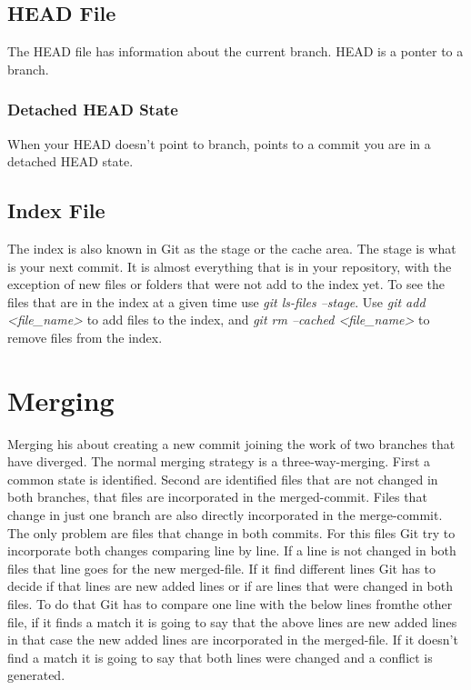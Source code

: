 \subsection{HEAD File}

The HEAD file has information about the current branch.
HEAD is a ponter to a branch.

\subsubsection{Detached HEAD State}

When your HEAD doesn't point to branch, points to a commit you are in a detached HEAD state.

\subsection{Index File}

The index is also known in Git as the stage or the cache area.
The stage is what is your next commit. It is almost everything that is in your repository, with the exception of new files or folders that were not add to the index yet.
To see the files that are in the index at a given time use \emph{git ls-files --stage}.
Use \emph{git add <file\_name>} to add files to the index, and \emph{git rm --cached <file\_name>} to remove files from the index.


\section{Merging}

Merging his about creating a new commit joining the work of two branches that have diverged.
The normal merging strategy is a three-way-merging.
First a common state is identified.
Second are identified files that are not changed in both branches, that files are incorporated in the merged-commit.
Files that change in just one branch are also directly incorporated in the merge-commit.
The only problem are files that change in both commits.
For this files Git try to incorporate both changes comparing line by line.
If a line is not changed in both files that line goes for the new merged-file.
If it find different lines Git has to decide if that lines are new added lines or if are lines that were changed in both files.
To do that Git has to compare one line with the below lines fromthe other file, if it finds a match it is going to say that the above lines are new added lines in that case the new added lines are incorporated in the merged-file.
If it doesn't find a match it is going to say that both lines were changed and a conflict is generated.

